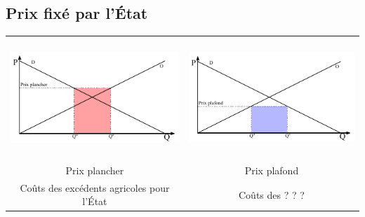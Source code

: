\subsection{Prix fixé par l'État}


\begin{center}
	\begin{tabular}{cc}
		\includegraphics[height=4.5cm]{images/graph_prix_plancher.pdf} & \includegraphics[height=4.5cm]{images/graph_prix_plafond.pdf}\\
		Prix plancher                                                  & Prix plafond\\
		\textcolor[rgb]{1,0,0}{Coûts des excédents agricoles pour l'État} & \textcolor[rgb]{0,0,1}{Coûts des ? ? ?}\\
	\end{tabular}
\end{center}